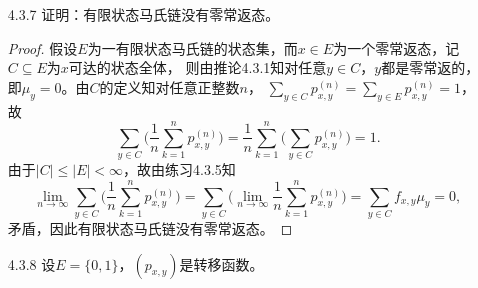 \begin{enumerate}
\begin{proof}
        $\textcircled{2}\:\lim\limits_{n\to\infty}\sum\limits_{j=1}^n\frac{j}{n}f_{x,y}^{(j)}S_{n-j}=0$。
        由于$\{S_k\}$是有界量，故只需证$\lim\limits_{n\to\infty}\sum\limits_{j=1}^n\frac{j}{n}f_{x,y}^{(j)}=0$。
        对任意$n\in\Z_+$，\[\sum_{j=1}^n\frac{j}{n}f_{x,y}^{(j)}=\sum_{j=1}^{n}\frac{j}{n}\E^x(1_{\{\tau_y=j\}})
        =\E^x\bigg(\sum_{j=1}^n\frac{j}{n}1_{\{\tau_y=j\}}\bigg)=\E^x\bigg(\sum_{j=1}^n\frac{\tau_y}{n}1_{\{\tau_y=j\}}\bigg)
        =\E^x\bigg(\frac{\tau_y}{n}1_{\{1\leqslant\tau_y\leqslant n\}}\bigg).\]
        注意到$\frac{\tau_y}{n}1_{\{1\leqslant\tau_y\leqslant n\}}\leqslant1$，且$\tau_y=\infty$时恒为$0$；
        $\tau_y<\infty$时趋于$0$ ($n\to\infty$时)，故由控制收敛定理即证。

        $\textcircled{3}\:\lim\limits_{n\to\infty}\frac{1}{n}\sum\limits_{k=1}^n p_{x,y}^{(k)}=f_{x,y}\mu_y$。
        由首达概率公式知
        \begin{align*}
            \frac{1}{n}\sum_{k=1}^np_{x,y}^{(k)}=&\frac{1}{n}\sum_{k=1}^n\sum_{j=1}^kf_{x,y}^{(j)}p_{y,y}^{(k-j)}\\
            =&\frac{1}{n}\sum_{j=1}^n\sum_{k=0}^{n-j}f_{x,y}^{(j)}p_{y,y}^{(k)}\\
            =&\sum_{j=1}^n\frac{n-j}{n}f_{x,y}^{(j)}S_{n-j}\\
            =&\bigg(\sum_{j=1}^nf_{x,y}^{(j)}S_{n-j}\bigg)-\bigg(\sum_{j=1}^n\frac{j}{n}f_{x,y}^{(j)}S_{n-j}\bigg),
        \end{align*}
        结合$\textcircled{1},\textcircled{2}$即证。
    \end{proof}
    \item[4.3.7] 证明：有限状态马氏链没有零常返态。
    \begin{proof}
        假设$E$为一有限状态马氏链的状态集，而$x\in E$为一个零常返态，记$C\subseteq E$为$x$可达的状态全体，
        则由推论4.3.1知对任意$y\in C$，$y$都是零常返的，即$\mu_y=0$。由$C$的定义知对任意正整数$n$，
        $\sum\limits_{y\in C}p_{x,y}^{(n)}=\sum\limits_{y\in E}p_{x,y}^{(n)}=1$，故
        \[\sum_{y\in C}\bigg(\frac{1}{n}\sum_{k=1}^np_{x,y}^{(n)}\bigg)=\frac{1}{n}\sum_{k=1}^n\bigg(\sum_{y\in C}p_{x,y}^{(n)}\bigg)=1.\]
        由于$|C|\leqslant|E|<\infty$，故由练习4.3.5知\[\lim_{n\to\infty}\sum_{y\in C}\bigg(\frac{1}{n}\sum_{k=1}^np_{x,y}^{(n)}\bigg)
        =\sum_{y\in C}\bigg(\lim_{n\to\infty}\frac{1}{n}\sum_{k=1}^np_{x,y}^{(n)}\bigg)=\sum_{y\in C}f_{x,y}\mu_y=0,\]
        矛盾，因此有限状态马氏链没有零常返态。
    \end{proof}
    \item[4.3.8] 设$E=\{0,1\}$，$(p_{x,y})$是转移函数。


\end{enumerate}
